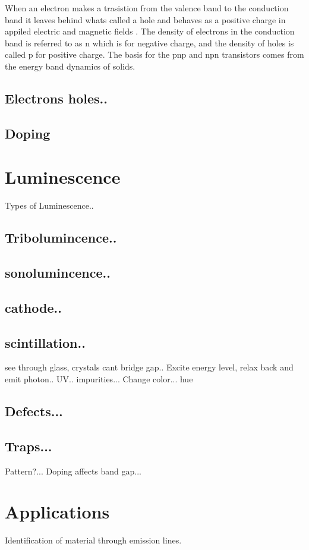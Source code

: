\documentclass[prl,onecolumn]{revtex4-1}  %
\begin{document}
\par
When an electron makes a trasistion from the valence band to the conduction band it leaves behind whats called a hole and behaves as a positive charge in appiled electric and magnetic fields \cite{Kittel}. The density of electrons in the conduction band is referred to as n which is for negative charge, and the density of holes is called p for positive charge. The basis for the pnp and npn transistors comes from the energy band dynamics of solids.  

\subsection*{Electrons holes..}

\subsection*{Doping}

\section{Luminescence}
Types of Luminescence..
\subsection*{Tribolumincence..}
\subsection*{sonolumincence..}
\subsection*{cathode..}
\subsection*{scintillation..}

see through glass, crystals cant bridge gap..
Excite energy level, relax back and emit photon.. UV..
impurities...
Change color... hue
\subsection*{Defects...}
\subsection*{Traps...}
Pattern?...
Doping affects band gap...

\section{Applications}
Identification of material through emission lines.
\end{document}
